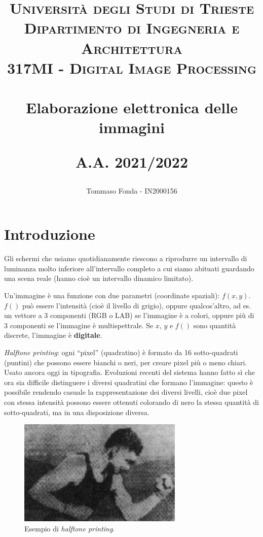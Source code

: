 \documentclass[a4paper,11pt]{article}
\title{
\normalfont \normalsize
\textsc{Università degli Studi di Trieste
\\ Dipartimento di Ingegneria e Architettura
\\ 317MI - Digital Image Processing} \\ [25pt]
\horrule{0.5pt} \\[0.4cm]
\huge Elaborazione elettronica delle immagini \\
\vspace{3mm}

\small A.A. 2021/2022
\horrule{2pt} \\[0.5cm]
}
\author{Tommaso Fonda - IN2000156}
\begin{document}
\maketitle
\begingroup
\hypersetup{linkcolor=black}
\newpage
\tableofcontents
\endgroup
\hypersetup{
  urlcolor     = red, %
  linkcolor    = red, %
  citecolor   = blue %
}
\newpage

\section{Introduzione}
Gli schermi che usiamo quotidianamente riescono a riprodurre un intervallo di luminanza molto inferiore
all'intervallo completo a cui siamo abituati guardando una scena reale (hanno cioè un intervallo dinamico limitato).
\par
Un'immagine è una funzione con due parametri (coordinate spaziali): $f(x,y)$.
$f()$ può essere l'intensità (cioè il livello di grigio), oppure qualcos'altro, ad es. un vettore
a 3 componenti (RGB o LAB) se l'immagine è a colori, oppure più di 3 componenti se l'immagine è
multispettrale.
Se $x$, $y$ e $f()$ sono quantità discrete, l'immagine è \textbf{digitale}.
\par
\textit{Halftone printing}: ogni ``pixel'' (quadratino) è formato da 16 sotto-quadrati (puntini) che possono essere bianchi o neri, per
creare pixel più o meno chiari. Usato ancora oggi in tipografia.
Evoluzioni recenti del sistema hanno fatto sì che ora sia difficile distinguere i diversi quadratini che
formano l'immagine: questo è possibile rendendo casuale la rappresentazione dei diversi livelli, cioè
due pixel con stessa intensità possono essere ottenuti colorando di nero la stessa quantità di sotto-quadrati, ma
in una disposizione diversa.

\renewcommand{\thefigure}{1.1}
\begin{figure}[!h]
  \centering
    \includegraphics[width=0.7\textwidth]{images/1/halftone.png}
    \caption{Esempio di \textit{halftone printing}.}
\end{figure}
\end{document}
